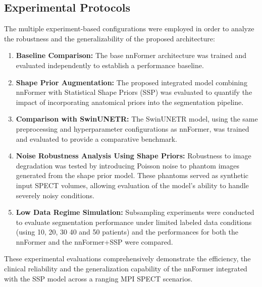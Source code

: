 \subsection{Experimental Protocols}

The multiple experiment-based configurations were employed in order to analyze the robustness and the generalizability of the proposed architecture:

\begin{enumerate}
\item \textbf{Baseline Comparison:} The base nnFormer architecture was trained and evaluated independently to establish a performance baseline.
\item \textbf{Shape Prior Augmentation:} The proposed integrated model combining nnFormer with Statistical Shape Priors (SSP) was evaluated to quantify the impact of incorporating anatomical priors into the segmentation pipeline.
\item \textbf{Comparison with SwinUNETR:} The SwinUNETR model, using the same preprocessing and hyperparameter configurations as nnFormer, was trained and evaluated to provide a comparative benchmark.
\item \textbf{Noise Robustness Analysis Using Shape Priors:} Robustness to image degradation was tested by introducing Poisson noise to phantom images generated from the shape prior model. These phantoms served as synthetic input SPECT volumes, allowing evaluation of the model's ability to handle severely noisy conditions.

\item \textbf{Low Data Regime Simulation:} Subsampling experiments were conducted to evaluate segmentation performance under limited labeled data conditions (using 10, 20, 30 40 and 50 patients) and the performances for both the nnFormer and the nnFormer+SSP were compared.

\end{enumerate}

These experimental evaluations comprehensively demonstrate the efficiency, the clinical reliability and the generalization capability of the nnFormer integrated with the SSP model across a ranging MPI SPECT scenarios.

